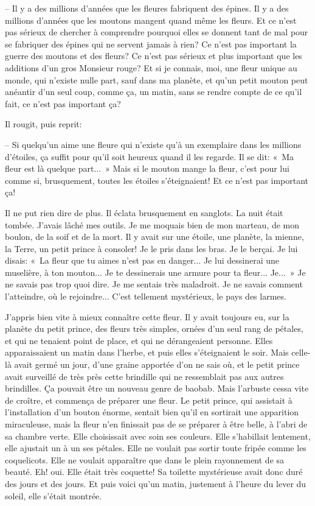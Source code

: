 \documentclass[a4paper]{report}
\begin{document}
-- Il y a des millions d'années que les fleures fabriquent des épines. Il y a des millions d'années que les moutons mangent quand même les fleurs. Et ce n'est pas sérieux de chercher à comprendre pourquoi elles se donnent tant de mal pour se fabriquer des épines qui ne servent jamais à rien? Ce n'est pas important la guerre des moutons et des fleurs? Ce n'est pas sérieux et plus important que les additions d'un gros Monsieur rouge? Et si je connais, moi, une fleur unique au monde, qui n'existe nulle part, sauf dans ma planète, et qu'un petit mouton peut anéantir d'un seul coup, comme ça, un matin, sans se rendre compte de ce qu'il fait, ce n'est pas important ça?

Il rougit, puis reprit:

-- Si quelqu'un aime une fleure qui n'existe qu'à un exemplaire dans les millions d'étoiles, ça suffit pour qu'il soit heureux quand il les regarde. Il se dit: «~Ma fleur est là quelque part...~» Mais si le mouton mange la fleur, c'est pour lui comme si, brusquement, toutes les étoiles s'éteignaient! Et ce n'est pas important ça!

Il ne put rien dire de plus. Il éclata brusquement en sanglots. La nuit était tombée. J'avais lâché mes outils. Je me moquais bien de mon marteau, de mon boulon, de la soif et de la mort. Il y avait sur une étoile, une planète, la mienne, la Terre, un petit prince à consoler! Je le pris dans les bras. Je le berçai. Je lui disais: «~La fleur que tu aimes n'est pas en danger... Je lui dessinerai une muselière, à ton mouton... Je te dessinerais une armure pour ta fleur... Je...~» Je ne savais pas trop quoi dire. Je me sentais très maladroit. Je ne savais comment l'atteindre, où le rejoindre... C'est tellement mystérieux, le pays des larmes.

\parachapter[VIII]{} %
J'appris bien vite à mieux connaître cette fleur. Il y avait toujours eu, sur la planète du petit prince, des fleurs très simples, ornées d'un seul rang de pétales, et qui ne tenaient point de place, et qui ne dérangeaient personne. Elles apparaissaient un matin dans l'herbe, et puis elles s'éteignaient le soir. Mais celle-là avait germé un jour, d'une graine apportée d'on ne sais où, et le petit prince avait surveillé de très près cette brindille qui ne ressemblait pas aux autres brindilles. Ça pouvait être un nouveau genre de baobab. Mais l'arbuste cessa vite de croître, et commença de préparer une fleur. Le petit prince, qui assistait à l'installation d'un bouton énorme, sentait bien qu'il en sortirait une apparition miraculeuse, mais la fleur n'en finissait pas de se préparer à être belle, à l'abri de sa chambre verte. Elle choisissait avec soin ses couleurs. Elle s'habillait lentement, elle ajustait un à un ses pétales. Elle ne voulait pas sortir toute fripée comme les coquelicots. Elle ne voulait apparaître que dans le plein rayonnement de sa beauté. Eh! oui. Elle était très coquette! Sa toilette mystérieuse avait donc duré des jours et des jours. Et puis voici qu'un matin, justement à l'heure du lever du soleil, elle s'était montrée.
\end{document}
